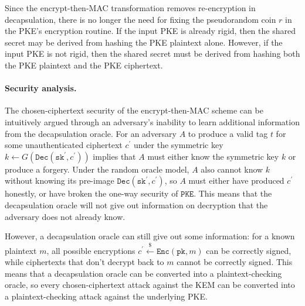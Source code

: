 \documentclass[runningheads]{llncs}
\newcommand{\pke}{\texttt{PKE}}
\newcommand{\encrypt}{\texttt{Enc}}
\newcommand{\decrypt}{\texttt{Dec}}
\newcommand{\kem}{\texttt{KEM}}
\newcommand{\etm}{\texttt{EtM}}  %
\newcommand{\pk}{\texttt{pk}}
\newcommand{\sk}{\texttt{sk}}
\newcommand{\leftsample}{\stackrel{\$}{\leftarrow}}
\begin{document}

Since the encrypt-then-MAC transformation removes re-encryption in decapsulation, there is no longer the need for fixing the pseudorandom coin $r$ in the PKE's encryption routine. If the input PKE is already rigid, then the shared secret may be derived from hashing the PKE plaintext alone. However, if the input PKE is not rigid, then the shared secret must be derived from hashing both the PKE plaintext and the PKE ciphertext. 

\paragraph{Security analysis.} The chosen-ciphertext security of the encrypt-then-MAC scheme can be intuitively argued through an adversary's inability to learn additional information from the decapsulation oracle. For an adversary $A$ to produce a valid tag $t$ for some unauthenticated ciphertext $c^\prime$ under the symmetric key $k \leftarrow G(\decrypt(\sk^\prime, c^\prime))$ implies that $A$ must either know the symmetric key $k$ or produce a forgery. Under the random oracle model, $A$ also cannot know $k$ without knowing its pre-image $\decrypt(\sk^\prime, c^\prime)$, so $A$ must either have produced $c^\prime$ honestly, or have broken the one-way security of $\pke$. This means that the decapsulation oracle will not give out information on decryption that the adversary does not already know. 

However, a decapsulation oracle can still give out some information: for a known plaintext $m$, all possible encryptions $c^\prime \leftsample \encrypt(\pk, m)$ can be correctly signed, while ciphertexts that don't decrypt back to $m$ cannot be correctly signed. This means that a decapsulation oracle can be converted into a plaintext-checking oracle, so every chosen-ciphertext attack against the KEM can be converted into a plaintext-checking attack against the underlying PKE.
\end{document}
